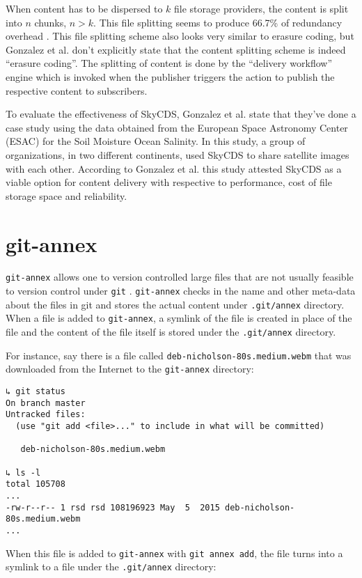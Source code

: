 When content has to be dispersed to $k$ file storage providers, the
content is split into $n$ chunks, $n > k$. This file splitting seems
to produce 66.7\% of redundancy overhead \cite{skycds}. This file
splitting scheme also looks very similar to erasure coding, but
Gonzalez et al. don't explicitly state that the content splitting
scheme is indeed ``erasure coding''. The splitting of content is done
by the ``delivery workflow'' engine which is invoked when the
publisher triggers the action to publish the respective content to
subscribers.

To evaluate the effectiveness of SkyCDS, Gonzalez et al. state that
they've done a case study using the data obtained from the European
Space Astronomy Center (ESAC) for the Soil Moisture Ocean Salinity. In
this study, a group of organizations, in two different continents,
used SkyCDS to share satellite images with each other. According to
Gonzalez et al. this study attested SkyCDS as a viable option for
content delivery with respective to performance, cost of file storage
space and reliability.

\section{git-annex}\label{2-gitannex-sec}

\verb+git-annex+ allows one to version controlled large files that are
not usually feasible to version control under \verb+git+
\cite{program:git}. \verb+git-annex+ checks in the name and other
meta-data about the files in git and stores the actual content under
\verb+.git/annex+ directory. When a file is added to \verb+git-annex+,
a symlink of the file is created in place of the file and the content
of the file itself is stored under the \verb+.git/annex+ directory.

For instance, say there is a file called
\verb+deb-nicholson-80s.medium.webm+ that was downloaded from the
Internet to the \verb+git-annex+ directory:

\begin{verbatim}
↳ git status
On branch master
Untracked files:
  (use "git add <file>..." to include in what will be committed)

   deb-nicholson-80s.medium.webm

↳ ls -l
total 105708
...
-rw-r--r-- 1 rsd rsd 108196923 May  5  2015 deb-nicholson-80s.medium.webm
...
\end{verbatim}

When this file is added to \verb+git-annex+ with \verb+git annex add+,
the file turns into a symlink to a file under the \verb+.git/annex+
directory:

